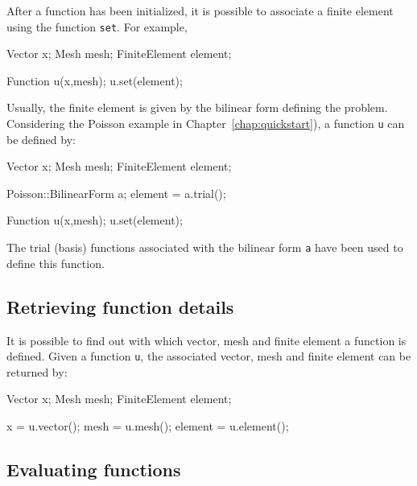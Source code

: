 After a function has been initialized, it is possible to associate a finite
element using the function \texttt{set}. For example, 
\begin{code}
  Vector x;
  Mesh mesh;
  FiniteElement element;

  Function u(x,mesh);
  u.set(element); 
\end{code}
Usually, the finite element is given by the bilinear form defining the
problem. Considering the Poisson example in Chapter~\ref{chap:quickstart}), a
function \texttt{u} can be defined by: 
\begin{code}
  Vector x;
  Mesh mesh;
  FiniteElement element;

  Poisson::BilinearForm a;
  element = a.trial();

  Function u(x,mesh);
  u.set(element); 
\end{code}
The trial (basis) functions associated with the bilinear form \texttt{a} have
been used to define this function.



\subsection{Retrieving function details}
%
It is possible to find out with which vector, mesh and finite element a
function is defined. Given a function \texttt{u}, the associated vector, mesh
and finite element can be returned by:
\begin{code}
  Vector x;
  Mesh mesh;
  FiniteElement element;

  x       = u.vector(); 
  mesh    = u.mesh(); 
  element = u.element(); 
\end{code}




\subsection{Evaluating functions}
%




